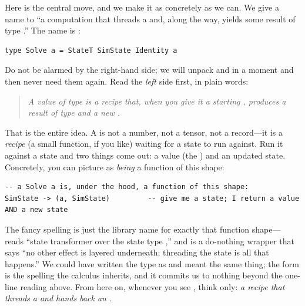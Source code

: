 Here is the central move, and we make it as concretely as we can. We give a name to
``a computation that threads a  and, along the way, yields some
result of type .'' The name is :

\begin{lstlisting}[style=l4style]
type Solve a = StateT SimState Identity a
\end{lstlisting}

\noindent Do not be alarmed by the right-hand side; we will unpack  and
 in a moment and then never need them again. Read the \emph{left} side
first, in plain words:

\begin{quote}\itshape
A value of type  is a recipe that, when you give it a starting
, produces a result of type  \emph{and} a new .
\end{quote}

\noindent That is the entire idea. A  is not a number, not a tensor,
not a record---it is a \emph{recipe} (a small function, if you like) waiting for a
state to run against. Run it against a state and two things come out: a value (the
) and an updated state. Concretely, you can picture  as
\emph{being} a function of this shape:

\begin{lstlisting}[style=l4style]
-- a Solve a is, under the hood, a function of this shape:
SimState -> (a, SimState)         -- give me a state; I return a value AND a new state
\end{lstlisting}

\noindent The fancy spelling  is just the library
name for exactly that function shape--- reads ``state transformer over
the state type ,'' and  is a do-nothing wrapper that
says ``no other effect is layered underneath; threading the state is all that
happens.'' We could have written the type as  and meant the
same thing; the  form is the spelling the calculus
inherits, and it commits us to nothing beyond the one-line reading above. From here
on, whenever you see , think only: \emph{a recipe that threads a
 and hands back an }.

